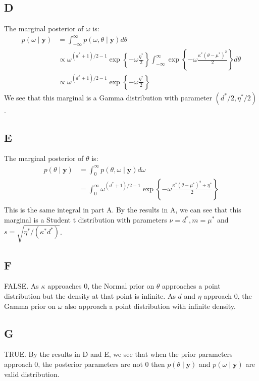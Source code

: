 \documentclass{article}
\begin{document}
\subsection*{D}
The marginal posterior of \(\omega\) is:
\begin{align*}
p(\omega \mid \mathbf{y}) &= \int_{-\infty}^{\infty} p(\omega, \theta \mid \mathbf{y}) d\theta\\
&\propto \omega^{(d^*+1)/2 - 1}\exp\left\lbrace -\omega \frac{\eta^*}{2}\right\rbrace \int_{-\infty}^{\infty} \exp\left\lbrace - \omega \frac{\kappa^*(\theta-\mu^*)^2}{2} \right\rbrace d\theta\\
&\propto \omega^{(d^*+1)/2 - 1}\exp\left\lbrace -\omega \frac{\eta^*}{2}\right\rbrace \tag{Gaussian integral}
\end{align*}
We see that this marginal is a Gamma distribution with parameter \((d^*/2, \eta^*/2)\).
\subsection*{E}
The marginal posterior of \(\theta\) is:
\begin{align*}
p(\theta \mid \mathbf{y}) &= \int_0^{\infty} p(\theta, \omega \mid \mathbf{y}) d\omega\\
&= \int_0^{\infty} \omega^{(d^*+1)/2-1} \exp \left\lbrace -\omega\frac{\kappa^*(\theta-\mu^*)^2 + \eta^*}{2}\right\rbrace\\
\end{align*}
This is the same integral in part A. By the results in A, we can see that this marginal is a Student t distribution with parameters \(\nu = d^*, m = \mu^*\) and \(s = \sqrt{\eta^*/(\kappa^* d^*)}\).

\subsection*{F}
FALSE. As \(\kappa\) approaches \(0\), the Normal prior on \(\theta\) approaches a point distribution but the density at that point is infinite. As \(d\) and \(\eta\) approach \(0\), the Gamma prior on \(\omega\) also approach a point distribution with infinite density.

\subsection*{G}
TRUE. By the results in D and E, we see that when the prior parameters approach \(0\), the posterior parameters are not \(0\) then \(p(\theta \mid \mathbf{y})\) and \(p(\omega \mid \mathbf{y})\) are valid distribution.
\end{document}
